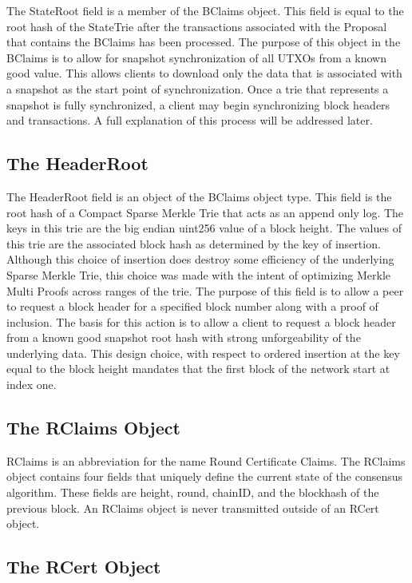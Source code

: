 The StateRoot field is a member of the BClaims object.
This field is equal to the root hash of the StateTrie after the
transactions associated with the Proposal that contains the BClaims has
been processed.
The purpose of this object in the BClaims is to allow for snapshot
synchronization of all UTXOs from a known good value.
This allows clients to download only the data that is associated with a
snapshot as the start point of synchronization.
Once a trie that represents a snapshot is fully synchronized, a client
may begin synchronizing block headers and transactions.
A full explanation of this process will be addressed later.


\subsection{The HeaderRoot}

The HeaderRoot field is an object of the BClaims object type.
This field is the root hash of a Compact Sparse Merkle Trie that acts
as an append only log.
The keys in this trie are the big endian uint256 value of a block
height.
The values of this trie are the associated block hash as determined by
the key of insertion.
Although this choice of insertion does destroy some efficiency of the
underlying Sparse Merkle Trie, this choice was made with the intent of
optimizing Merkle Multi Proofs across ranges of the trie.
The purpose of this field is to allow a peer to request a block header
for a specified block number along with a proof of inclusion.
The basis for this action is to allow a client to request a block
header from a known good snapshot root hash with strong unforgeability
of the underlying data.
This design choice, with respect to ordered insertion at the key equal
to the block height mandates that the first block of the network start
at index one.


\subsection{The RClaims Object}

RClaims is an abbreviation for the name Round Certificate Claims.
The RClaims object contains four fields that uniquely define the
current state of the consensus algorithm.
These fields are height, round, chainID, and the blockhash of the
previous block.
An RClaims object is never transmitted outside of an RCert object.

\subsection{The RCert Object}

